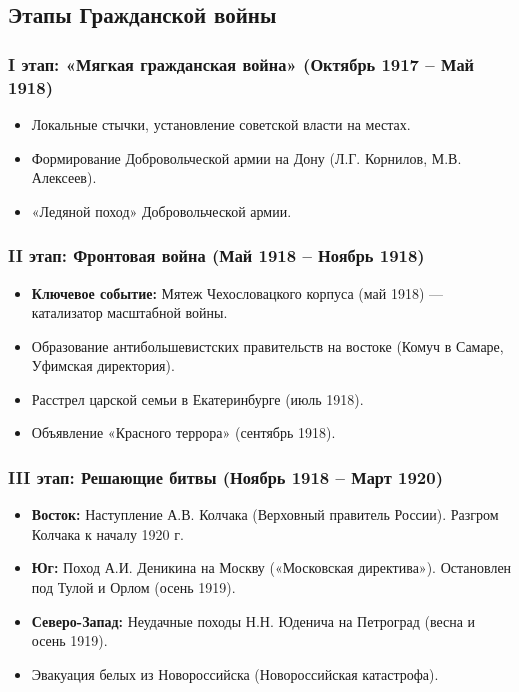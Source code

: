 \documentclass[12pt]{article}
\begin{document}
	\subsection{Этапы Гражданской войны}
	
	\subsubsection{I этап: «Мягкая гражданская война» (Октябрь 1917 -- Май 1918)}
	\begin{itemize}
		\item Локальные стычки, установление советской власти на местах.
		\item Формирование Добровольческой армии на Дону (Л.Г. Корнилов, М.В. Алексеев).
		\item «Ледяной поход» Добровольческой армии.
	\end{itemize}
	
	\subsubsection{II этап: Фронтовая война (Май 1918 -- Ноябрь 1918)}
	\begin{itemize}
		\item \textbf{Ключевое событие:} Мятеж Чехословацкого корпуса (май 1918) --- катализатор масштабной войны.
		\item Образование антибольшевистских правительств на востоке (Комуч в Самаре, Уфимская директория).
		\item Расстрел царской семьи в Екатеринбурге (июль 1918).
		\item Объявление «Красного террора» (сентябрь 1918).
	\end{itemize}
	
	\subsubsection{III этап: Решающие битвы (Ноябрь 1918 -- Март 1920)}
	\begin{itemize}
		\item \textbf{Восток:} Наступление А.В. Колчака (Верховный правитель России). Разгром Колчака к началу 1920 г.
		\item \textbf{Юг:} Поход А.И. Деникина на Москву («Московская директива»). Остановлен под Тулой и Орлом (осень 1919).
		\item \textbf{Северо-Запад:} Неудачные походы Н.Н. Юденича на Петроград (весна и осень 1919).
		\item Эвакуация белых из Новороссийска (Новороссийская катастрофа).
	\end{itemize}
	
\end{document}
